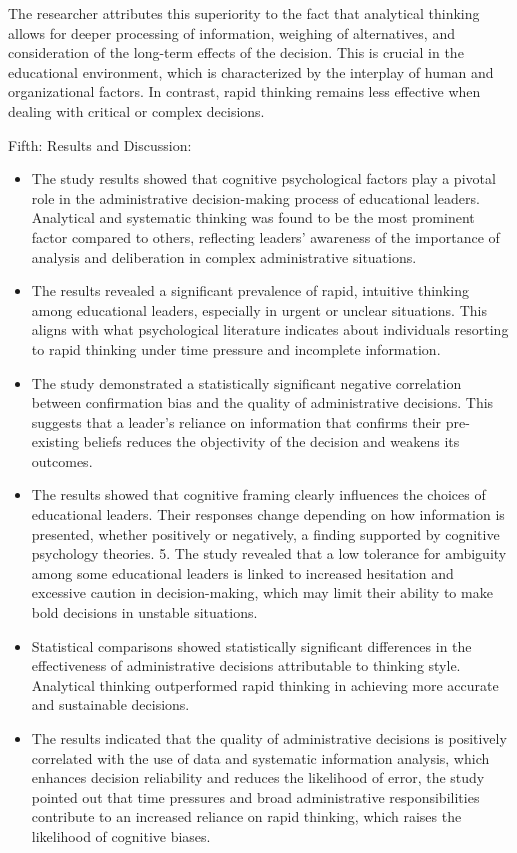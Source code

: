 \documentclass[10pt]{NSP1}
\begin{document}
The researcher attributes this superiority to the fact that analytical thinking allows for deeper processing of information, weighing of alternatives, and consideration of the long-term effects of the decision. This is crucial in the educational environment, which is characterized by the interplay of human and organizational factors. In contrast, rapid thinking remains less effective when dealing with critical or complex decisions.

Fifth: Results and Discussion:

\begin{itemize}
  \item The study results showed that cognitive psychological factors play a pivotal role in the administrative decision-making process of educational leaders. Analytical and systematic thinking was found to be the most prominent factor compared to others, reflecting leaders' awareness of the importance of analysis and deliberation in complex administrative situations.
  \item The results revealed a significant prevalence of rapid, intuitive thinking among educational leaders, especially in urgent or unclear situations. This aligns with what psychological literature indicates about individuals resorting to rapid thinking under time pressure and incomplete information.
  \item The study demonstrated a statistically significant negative correlation between confirmation bias and the quality of administrative decisions. This suggests that a leader's reliance on information that confirms their pre-existing beliefs reduces the objectivity of the decision and weakens its outcomes.
  \item The results showed that cognitive framing clearly influences the choices of educational leaders. Their responses change depending on how information is presented, whether positively or negatively, a finding supported by cognitive psychology theories. 5. The study revealed that a low tolerance for ambiguity among some educational leaders is linked to increased hesitation and excessive caution in decision-making, which may limit their ability to make bold decisions in unstable situations.
  \item Statistical comparisons showed statistically significant differences in the effectiveness of administrative decisions attributable to thinking style. Analytical thinking outperformed rapid thinking in achieving more accurate and sustainable decisions.
  \item The results indicated that the quality of administrative decisions is positively correlated with the use of data and systematic information analysis, which enhances decision reliability and reduces the likelihood of error, the study pointed out that time pressures and broad administrative responsibilities contribute to an increased reliance on rapid thinking, which raises the likelihood of cognitive biases.

\end{itemize}
\end{document}
